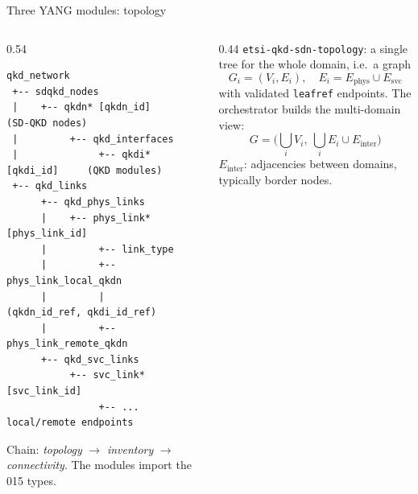 \documentclass[10pt]{beamer}
\begin{document}
\begin{frame}[fragile]{Three YANG modules: topology}
  \begin{columns}[T]
    \begin{column}{0.54\textwidth}
\begin{lstlisting}[basicstyle=\ttfamily\fontsize{5.8}{6.6}\selectfont]
qkd_network
 +-- sdqkd_nodes
 |    +-- qkdn* [qkdn_id]               (SD-QKD nodes)
 |         +-- qkd_interfaces
 |              +-- qkdi* [qkdi_id]     (QKD modules)
 +-- qkd_links
      +-- qkd_phys_links
      |    +-- phys_link* [phys_link_id]
      |         +-- link_type
      |         +-- phys_link_local_qkdn
      |         |    (qkdn_id_ref, qkdi_id_ref)
      |         +-- phys_link_remote_qkdn
      +-- qkd_svc_links
           +-- svc_link* [svc_link_id]
                +-- ... local/remote endpoints
\end{lstlisting}
      \footnotesize Chain: \emph{topology} $\to$ \emph{inventory} $\to$
      \emph{connectivity}. The modules import the 015 types.
    \end{column}
    \begin{column}{0.44\textwidth}
      \small \texttt{etsi-qkd-sdn-topology}: a single tree for the whole
      domain, i.e.\ a graph
      \[
        G_i = (V_i, E_i),\quad E_i = E_{\text{phys}}\cup E_{\text{svc}}
      \]
      with validated \texttt{leafref} endpoints. The orchestrator builds
      the multi-domain view:
      \[
        G = \Big(\bigcup_i V_i,\ \bigcup_i E_i \cup E_{\text{inter}}\Big)
      \]
      \footnotesize $E_{\text{inter}}$: adjacencies between domains,
      typically border nodes.
    \end{column}
  \end{columns}
\end{frame}
\end{document}
